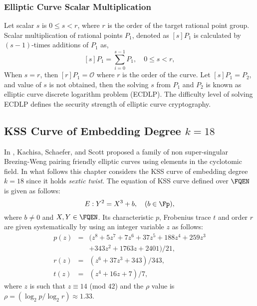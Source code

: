 \subsubsection{Elliptic Curve Scalar Multiplication}
Let scalar $s$ is $0 \leq s < r$, where $r$ is the order of the target rational point group. Scalar multiplication of rational points $P_1$, denoted as $[s]P_1$ is calculated by $(s-1)$-times additions of $P_1$ as,
\begin{equation}\label{eqn_scalar_mul_chapter_g2scm_kss18}
[s]P_1 = \sum_{i=0}^{s-1} P_1, \quad \text{$0 \leq s < r$},
\end{equation}
When $s = r$, then $[r]P_1 = \mathcal{O}$ where $r$ is the order of the curve. Let $[s]P_1 = P_2$, and value of $s$ is not obtained, then the solving $s$ from $P_1$ and $P_2$ is known as elliptic curve discrete logarithm problem (ECDLP). The difficulty level of solving ECDLP defines the security strength of elliptic curve cryptography.

\subsection{KSS Curve of Embedding Degree \texorpdfstring{$k=18$}{\textit{k=18}}}
In  \cite{EPRINT:KacSchSco07}, Kachisa, Schaefer, and Scott proposed a family of non super-singular Brezing-Weng pairing friendly elliptic curves using elements in the cyclotomic field. In what follows this chapter considers the KSS curve of  embedding degree $k=18$ since it holds \textit{sextic twist}. 
The equation of KSS curve defined over $\FQEN$ is given as follows:
\begin{equation}\label{eqn_kss18curve_chapter_g2scm_kss18}
E:Y^2=X^3+b, \quad \mbox{($b \in \Fp$)},
\end{equation}
where $b \neq 0$ and $X,Y \in \FQEN$. Its characteristic $p$, Frobenius trace $t$ and order $r$ are given systematically by using an integer variable $z$ as follows:
\begin{subequations}
\begin{eqnarray}
p(z) &= & (z^8 +5z^7 +7z^6 +37z^5 +188z^4 +259z^3  \nonumber \\ 								
& & + 343z^2 +1763z+2401)/21,\\\label{eq:kss_char_chapter_g2scm_kss18}
r(z) &= &(z^6 + 37z^3 + 343)/343,\label{eq:kss_degree_chapter_g2scm_kss18}  \\
t(z) &=& (z^4 + 16z + 7)/7, \label{eq:kss_trace_chapter_g2scm_kss18} 
\end{eqnarray}
\end{subequations} 
where $z$ is such that $z \equiv 14$ (mod $42$) and the $\rho$ value is $\rho = (\log_2 p/\log_2 r) \approx 1.33$.

